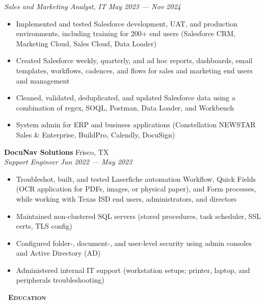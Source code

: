 \documentclass[a4paper,11pt]{article}
\newcommand{\header} [1] {
    \vspace{1mm}
    {\textsc{\textbf{\Large{\xrfill[0.5ex]{0.5pt}~#1~\xrfill[0.5ex]{0.5pt}}}}} %
}
\begin{document}
\textit{Sales and Marketing Analyst, IT} \hfill  \textit{May 2023 --- Nov 2024} 
\begin{itemize}
    \item Implemented and tested Salesforce development, UAT, and production environments, including training for 200+ end users (Salesforce CRM, Marketing Cloud, Sales Cloud, Data Loader) 
    \item Created Salesforce weekly, quarterly, and ad hoc reports, dashboards, email templates, workflows, cadences, and flows for sales and marketing end users and management
    \item Cleaned, validated, deduplicated, and updated Salesforce data using a combination of regex, SOQL, Postman, Data Loader, and Workbench
    \item System admin for ERP and business applications (Constellation NEWSTAR Sales \& Enterprise, BuildPro, Calendly, DocuSign)
\end{itemize}
\vspace{1mm}

\textbf{DocuNav Solutions} \hfill Frisco, TX \\
\textit{Support Engineer} \hfill  \textit{Jun 2022 --- May 2023} 
\begin{itemize}
    \item Troubleshot, built, and tested Laserfiche automation Workflow, Quick Fields (OCR application for PDFs, images, or physical paper), and Form processes, while working with Texas ISD end users, administrators, and directors
    \item Maintained non-clustered SQL servers (stored procedures, task scheduler, SSL certs, TLS config)
    \item Configured folder-, document-, and user-level security using admin consoles and Active Directory (AD)
    \item Administered internal IT support (workstation setups; printer, laptop, and peripherals troubleshooting)
\end{itemize}    
\vspace{1mm}


\header{Education} 
\end{document}
